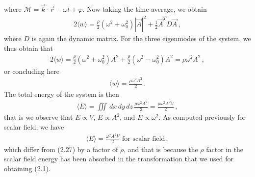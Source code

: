 \documentclass[11pt, onesided]{book}
\theoremstyle{break}
\theoremstyle{break}
\begin{document}
where $\mathcal{M} = \vec{k}\cdot \vec{r} - \omega t + \varphi$. Now taking the time average, we obtain
\begin{align*}
2\langle w\rangle = \frac{\rho}{2}(\omega^2 + \omega_0^2)|\vec{A}|^2 + \frac{1}{2}\vec{A}^T D \vec{A}\,,
\end{align*}
where $D$ is again the dynamic matrix. For the three eigenmodes of the system, we thus obtain that 
\begin{align*}
2\langle w\rangle = \frac{\rho}{2}\left( \omega^2 + \omega_0^2\right)A^2 + \frac{\rho}{2}(\omega^2 - \omega_0^2)A^2 = \rho \omega^2 A^2\,,
\end{align*}
or concluding here 
\begin{align*}
\langle w\rangle = \frac{\rho \omega^2 A^2}{2}\,.
\end{align*}
The total energy of the system is then
\begin{align}
\langle E\rangle = \iiint \, dx\, dy\, dz \, \frac{\rho \omega^2 A^2}{2} = \frac{\rho \omega^2 A^2V}{2}\,,
\end{align}
that is we observe that $E \propto V$, $E\propto A^2$, and $E \propto \omega^2$. As computed previously for scalar field, we have
\begin{align*}
\langle E\rangle = \frac{\omega^2 A^2V}{2} \text{ for scalar field}\,,
\end{align*}
which differ from (2.27) by a factor of $\rho$, and that is because the $\rho$ factor in the scalar field energy has been absorbed in the transformation that we used for obtaining (2.1). \\
\end{document}
